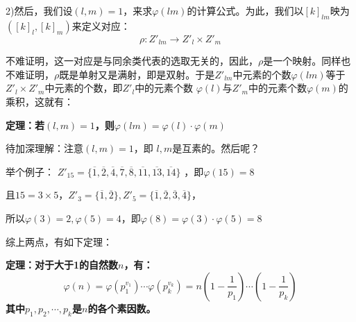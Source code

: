 \documentclass[12pt]{article}
\begin{document}
2)然后，我们设$(l,m)=1$，来求$\varphi(lm)$的计算公式。为此，我们以$[k]_{lm}$映为$([k]_l, [k]_m)$来定义对应：
$$
\rho: Z'_{lm} \rightarrow Z'_l \times Z'_m
$$

不难证明，这一对应是与同余类代表的选取无关的，因此，$\rho$是一个映射。同样也不难证明，$\rho$既是单射又是满射，即是双射。于是$Z'_{lm}$中元素的个数$\varphi(lm)$等于$Z'_l \times Z'_m$中元素的个数，即$Z'_l$中的元素个数
$\varphi(l)$与$Z'_m$中的元素个数$\varphi(m)$的乘积，这就有：

\begin{mdframed}[
linecolor=black!40,outerlinewidth=1pt,roundcorner=.5em,innertopmargin=1ex,innerbottommargin=.5\baselineskip,innerrightmargin=1em,innerleftmargin=1em,backgroundcolor=gray!5,
]
\textbf{
定理：若$(l,m) = 1$，则$\varphi(lm) = \varphi(l) \cdot  \varphi(m)$
}
\end{mdframed}

\begin{framed}
\small{
待加深理解：注意$(l,m)=1$，即 $l,m$是互素的。然后呢？

举个例子：
$Z'_{15} = \{\overline{1}, \overline{2}, \overline{4}, \overline{7}, \overline{8}, \overline{11}, \overline{13}, \overline{14}\}$
，即$\varphi(15) = 8$

且$15 = 3 \times 5$，$Z'_3 = \{\overline{1}, \overline{2}\}, Z'_5 = \{\overline{1}, \overline{2}, \overline{3}, \overline{4}\}$，

所以$\varphi(3) = 2, \varphi(5) = 4$，即$\varphi(8) = \varphi(3) \cdot  \varphi(5) = 8$
}
\end{framed}

综上两点，有如下定理：
\begin{mdframed}[
linecolor=black!40,outerlinewidth=1pt,roundcorner=.5em,innertopmargin=1ex,innerbottommargin=.5\baselineskip,innerrightmargin=1em,innerleftmargin=1em,backgroundcolor=gray!5,
]
\textbf{
定理：对于大于1的自然数$n$，有：
$$
\varphi(n) = \varphi(p_1^{v_1})\cdots\varphi(p_k^{v_k}) = n(1-\frac{1}{p_1})\cdots(1-\frac{1}{p_k})
$$
其中$p_1, p_2, \cdots, p_k$是$n$的各个素因数。
}
\end{mdframed}
\end{document}
